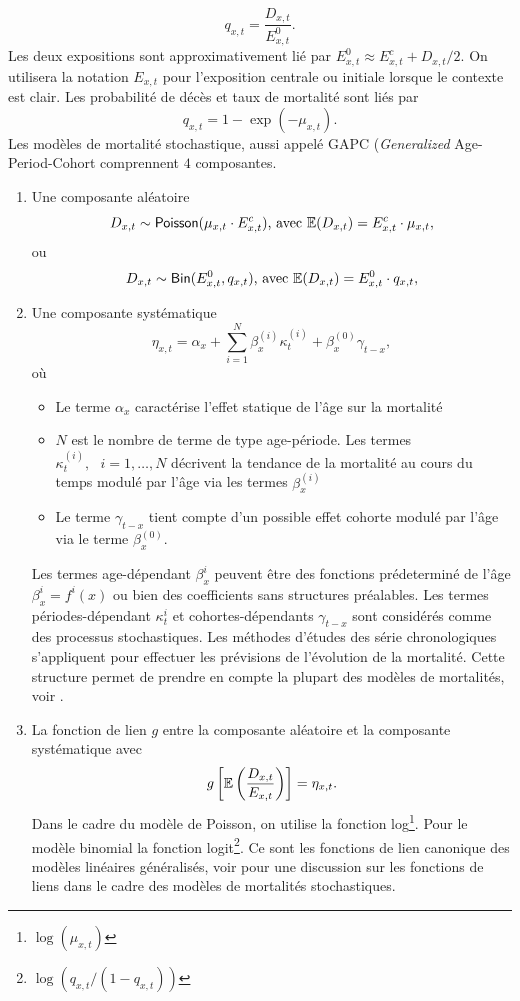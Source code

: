$$
q_{x,t} = \frac{D_{x,t}}{E_{x,t}^0}.
$$
Les deux expositions sont approximativement lié par $E_{x,t}^0\approx E_{x,t}^c +D_{x,t}/2$. On utilisera la notation $E_{x,t}$ pour l'exposition centrale ou initiale lorsque le contexte est clair. Les probabilité de décès et taux de mortalité sont liés par
$$
q_{x,t}=1-\exp(-\mu_{x,t}).
$$
Les modèles de mortalité stochastique, aussi appelé GAPC (\textit{Generalized} Age-Period-Cohort comprennent $4$ composantes.
\begin{enumerate}  
  \item Une composante aléatoire  
  $$
D_{x,t}\sim \mathsf{Poisson}(\mu_{x,t}\cdot E_{x,t}^c)\text{, avec }\mathbb{E}(D_{x,t}) = E_{x,t}^c\cdot \mu_{x,t},
  $$
  ou
  $$
D_{x,t}\sim \mathsf{Bin}( E_{x,t}^0, q_{x,t})\text{, avec }\mathbb{E}(D_{x,t}) = E_{x,t}^0\cdot q_{x,t},
  $$
  \item Une composante systématique
  $$
\eta_{x,t} = \alpha_x + \sum_{i=1}^N \beta_{x}^{(i)}\kappa_{t}^{(i)}+\beta_{x}^{(0)}\gamma_{t-x},
  $$
  où
  \begin{itemize}
    \item Le terme $\alpha_x$ caractérise l'effet statique de l'âge sur la mortalité
    \item $N$ est le nombre de terme de type age-période. Les termes $\kappa_t^{(i)},\text{ }i=1,\ldots, N$ décrivent la tendance de la mortalité au cours du temps modulé par l'âge via les termes $\beta_x^{(i)}$
    \item Le terme $\gamma_{t-x}$ tient compte d'un possible effet cohorte modulé par l'âge via le terme $\beta_{x}^{(0)}$.
  \end{itemize}
  Les termes age-dépendant $\beta_x^{i}$ peuvent être des fonctions prédeterminé de l'âge $\beta_x^{i} = f^{i}(x)$ ou bien des coefficients sans structures préalables. Les termes périodes-dépendant $\kappa_t^{i}$ et cohortes-dépendants $\gamma_{t-x}$ sont considérés comme des processus stochastiques. Les méthodes d'études des série chronologiques s'appliquent pour effectuer les prévisions de l'évolution de la mortalité. Cette structure permet de prendre en compte la plupart des modèles de mortalités, voir \citet{Hunt2020}.
  \item La fonction de lien $g$ entre la composante aléatoire et la composante systématique avec 
  $$
  g\left[\mathbb{E}\left(\frac{D_{x,t}}{E_{x,t}}\right)\right] =  \eta_{x,t}.
  $$
  Dans le cadre du modèle de Poisson, on utilise la fonction log\footnote{$\log(\mu_{x,t})$}. Pour le modèle binomial la fonction logit\footnote{$\log(q_{x,t}/(1-q_{x,t}))$}. Ce sont les fonctions de lien canonique des modèles linéaires généralisés, voir \citet{Currie2014} pour une discussion sur les fonctions de liens dans le cadre des modèles de mortalités stochastiques.

\end{enumerate}

